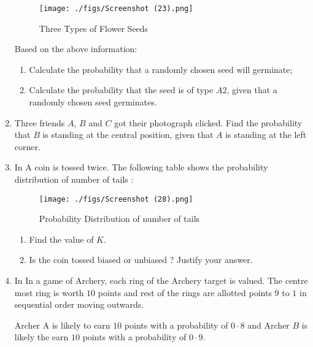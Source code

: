 \documentclass{article}
\theoremstyle{remark}
\begin{document}
\begin{enumerate}[label=\arabic*.,ref=\theenumi]
\begin{figure}[H]
        \centering
        \texttt{[image: ./figs/Screenshot (23).png]}
        \caption{Three Types of Flower Seeds}
        \label{fig:fig2.png}
    \end{figure}

    Based on the above information:
    
    \begin{enumerate}[label=(\alph*)]
    
 \item Calculate the probability that a randomly chosen seed will germinate;
 
 \item Calculate the probability that the seed is of type $A2$, given that a randomly chosen seed germinates.

\end{enumerate}

\item Three friends $A$, $B$ and $C$ got their photograph clicked. Find the 
probability that $B$ is standing at the central position, given that $A$ is 
standing at the left corner. 

\item In  A coin is tossed twice. The following table shows the probability 
distribution of number of tails :
\begin{figure}[H]
        \centering
        \texttt{[image: ./figs/Screenshot (28).png]}
        \caption{Probability Distribution of number of tails}
        \label{fig:fig3.png}
    \end{figure}

    \begin{enumerate}[label=(\alph*)]
    
 \item  Find the value of $K$. 
 
 \item  Is the coin tossed biased or unbiased ? Justify your answer.

\end{enumerate}

\item In  In a game of Archery, each ring of the Archery target is valued. The 
centre most ring is worth $10$ points and rest of the rings are allotted 
points $9$ to $1$ in sequential order moving outwards.

Archer A is likely to earn $10$ points with a probability of $0·8$ and Archer $B$ 
is likely the earn $10$ points with a probability of $0·9$.


\end{enumerate}
\end{document}
